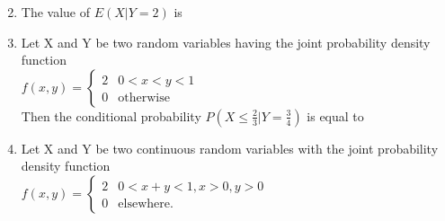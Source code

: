 \begin{enumerate}[label=\thesection.\arabic*.,ref=\thesection.\theenumi]
\begin{enumerate}
\begin{multicols}{2}
        \end{multicols}
        \end{enumerate}
        
        \item The value of $E(X|Y=2)$ is
        
        \begin{enumerate}
        \end{enumerate}
        
        \item Let X and Y be two random variables having the joint probability density function \\

        $
        f(x,y)=
        \begin{cases}
        2 &  0<x<y<1 \\
        0 & \text{otherwise}
        \end{cases}
        $ \\
        Then the conditional probability $P(X \leqslant {\frac{2}{3}}| Y={\frac{3}{4}})$ is equal to
        
        \begin{enumerate}
        \end{enumerate}
        

            
\item             Let X and Y be two continuous random variables with the joint probability density function \\
            $
            f(x,y)= 
            \begin{cases}
            2 & 0<x+y<1, x>0, y>0 \\
            0 & \text{elsewhere}.
            \end{cases}
            $
            

\end{enumerate}

